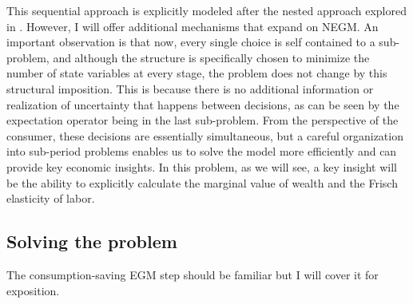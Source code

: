 \documentclass[\econtexRoot/EGMN]{subfiles}
\begin{document}
This sequential approach is explicitly modeled after the nested approach explored in \cite{Druedahl2017-lt}. However, I will offer additional mechanisms that expand on NEGM. An important observation is that now, every single choice is self contained to a sub-problem, and although the structure is specifically chosen to minimize the number of state variables at every stage, the problem does not change by this structural imposition. This is because there is no additional information or realization of uncertainty that happens between decisions, as can be seen by the expectation operator being in the last sub-problem. From the perspective of the consumer, these decisions are essentially simultaneous, but a careful organization into sub-period problems enables us to solve the model more efficiently and can provide key economic insights. In this problem, as we will see, a key insight will be the ability to explicitly calculate the marginal value of wealth and the Frisch elasticity of labor.



%

\subsection{Solving the problem}

The consumption-saving EGM step should be familiar but I will cover it for exposition.
\end{document}
